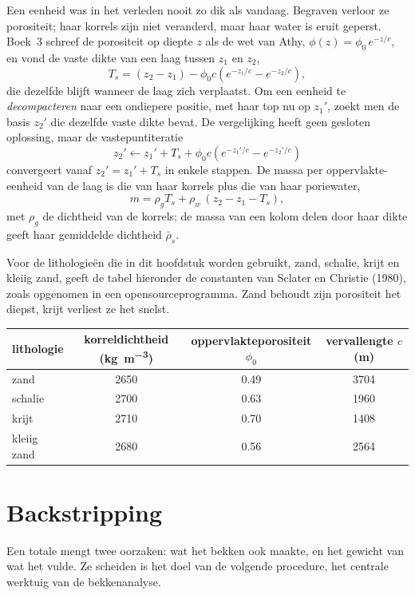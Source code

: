 Een eenheid was in het verleden nooit zo dik als vandaag. Begraven verloor ze porositeit; haar korrels zijn
niet veranderd, maar haar water is eruit geperst. Boek~3 schreef de porositeit op diepte
$z$ als de wet van Athy, $\phi(z) = \phi_0\,e^{-z/c}$, en vond de vaste dikte van een laag tussen
$z_1$ en $z_2$,
\[
  T_s = (z_2 - z_1) - \phi_0 c\left(e^{-z_1/c} - e^{-z_2/c}\right),
\]
die dezelfde blijft wanneer de laag zich verplaatst. Om een eenheid te \emph{decompacteren} naar een ondiepere positie,
met haar top nu op $z_1'$, zoekt men de basis $z_2'$ die dezelfde vaste dikte bevat. De
vergelijking heeft geen gesloten oplossing, maar de vastepuntiteratie
\[
  z_2' \leftarrow z_1' + T_s + \phi_0 c\left(e^{-z_1'/c} - e^{-z_2'/c}\right)
\]
convergeert vanaf $z_2' = z_1' + T_s$ in enkele stappen. De massa per oppervlakte-eenheid van de laag
is die van haar korrels plus die van haar poriewater,
\[
  m = \rho_g T_s + \rho_w\,(z_2 - z_1 - T_s),
\]
met $\rho_g$ de dichtheid van de korrels; de massa van een kolom delen door haar dikte geeft
haar gemiddelde dichtheid $\bar\rho_s$.

Voor de lithologieën die in dit hoofdstuk worden gebruikt, zand, schalie, krijt en kleiig zand, geeft de tabel hieronder
de constanten van Sclater en Christie (1980), zoals opgenomen in een opensourceprogramma.
Zand behoudt zijn porositeit het diepst, krijt verliest ze het snelst.

\begin{center}
\small
\begin{tabular}{lccc}
\hline
lithologie & korreldichtheid (\unit{kg.m^{-3}}) & oppervlakteporositeit $\phi_0$ & vervallengte $c$ (\unit{m}) \\
\hline
zand & 2650 & 0.49 & 3704 \\
schalie & 2700 & 0.63 & 1960 \\
krijt & 2710 & 0.70 & 1408 \\
kleiig zand & 2680 & 0.56 & 2564 \\
\hline
\end{tabular}
\end{center}

\section{Backstripping}\label{sec:b2:basins-compared:backstripping}

Een totale  mengt twee oorzaken: wat het bekken ook maakte, en het gewicht van wat
het vulde. Ze scheiden is het doel van de volgende procedure, het centrale werktuig van de
bekkenanalyse.

